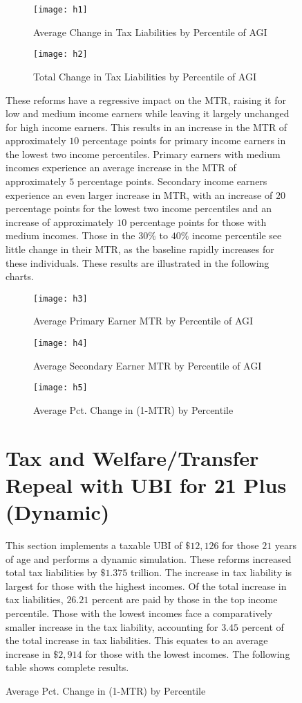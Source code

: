 \documentclass{article}
\begin{document}
\begin{figure}[H]
\begin{figure}[H]
\centering
\caption{Average Change in Tax Liabilities by Percentile of AGI}
\texttt{[image: h1]}
\end{figure}

\begin{figure}[H]
\centering
\caption{Total Change in Tax Liabilities by Percentile of AGI}
\texttt{[image: h2]}
\end{figure}

These reforms have a regressive impact on the MTR, raising it for low and medium income earners while leaving it largely unchanged for high income earners. This results in an increase in the MTR of approximately $10$ percentage points for primary income earners in the lowest two income percentiles. Primary earners with medium incomes experience an average increase in the MTR of approximately $5$ percentage points. Secondary income earners experience an even larger increase in MTR, with an increase of $20$ percentage points for the lowest two income percentiles and an increase of approximately $10$ percentage points for those with medium incomes. Those in the $30\%$ to $40\%$ income percentile see little change in their MTR, as the baseline rapidly increases for these individuals. These results are illustrated in the following charts. 

\begin{figure}[H]
\centering
\caption{Average Primary Earner MTR by Percentile of AGI}
\texttt{[image: h3]}
\end{figure}

\begin{figure}[H]
\centering
\caption{Average Secondary Earner MTR by Percentile of AGI}
\texttt{[image: h4]}
\end{figure}

\begin{figure}[H]
\centering
\caption{Average Pct. Change in (1-MTR) by Percentile}
\texttt{[image: h5]}
\end{figure}

\section{Tax and Welfare/Transfer Repeal with UBI for 21 Plus (Dynamic)}
This section implements a taxable UBI of $\$12,126$ for those $21$ years of age and performs a dynamic simulation. These reforms increased total tax liabilities by $\$1.375$ trillion. The increase in tax liability is largest for those with the highest incomes. Of the total increase in tax liabilities, $26.21$ percent are paid by those in the top income percentile. Those with the lowest incomes face a comparatively smaller increase in the tax liability, accounting for $3.45$ percent of the total increase in tax liabilities. This equates to an average increase in $\$2,914$ for those with the lowest incomes. The following table shows complete results.


\end{figure}
\end{document}
